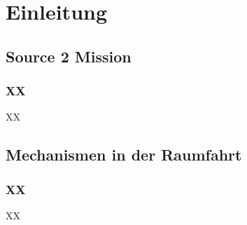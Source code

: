 \newpage
\chapter{Einleitung}
\section{Source 2 Mission}
\subsection{XX}
XX


\section{Mechanismen in der Raumfahrt}
\subsection{XX}
XX


